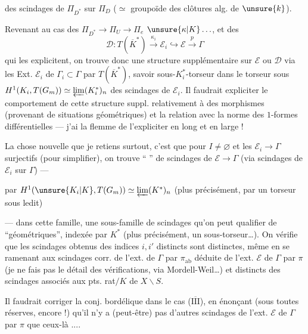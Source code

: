 

des scindages de $\Pi_{D^*}$  sur $\Pi_D$ ($\simeq$ groupoïde des clôtures alg. de $\unsure{k}$).

Revenant au cas des  $\Pi_{D^*}\to\Pi_U\to\Pi_e$ $\unsure{\kappa|K}\ldots$, et des 
\[
\mathcal{D}:T(\overline{K}^*)\xrightarrow{\kappa_i}\mathcal{E}_i\hookrightarrow\mathcal{E}\xrightarrow{p}\Gamma
\]
qui les explicitent, on trouve donc une structure supplémentaire sur $\mathcal{E}$ ou $\mathcal{D}$ via  les Ext. $\mathcal{E}_i$ de $\Gamma_i\subset\Gamma$ par $T(\overline{K}^*)$, savoir   sous-$K_i^*$-torseur dans le torseur sous
$H^1(K_i,T(G_m))\simeq\varprojlim(K_i^*)_n$ des  scindages de $\mathcal{E}_i$.
Il faudrait expliciter le comportement de cette structure suppl. relativement à des morphismes (provenant de situations géométriques) et la relation avec la norme des $1$-formes différentielles --- j'ai la flemme de l'expliciter en long et en large !

La chose nouvelle que je retiens surtout, c'est que pour $I\ne\varnothing$ et les $\mathcal{E}_i\to\Gamma$ surjectifs (pour simplifier), on trouve   `` '' de scindages de $\mathcal{E}\to\Gamma$ (via scindages de $\mathcal{E}_i$ sur $\Gamma$) ---  



par $H^1(\unsure{K_i|K},T(G_m))\simeq\varprojlim(K^*)_n$ (plus précisément, par un torseur sous ledit)

--- dans cette famille, une sous-famille de scindages qu'on peut qualifier de ``géométriques'', indexée par $K^*$ (plus précisément, un sous-torseur\ldots).
On vérifie que les scindages obtenus  des indices $i,i'$ distincts sont distinctes, même en se ramenant aux \unsure{$\pi$-}scindages corr. de l'ext. de $\Gamma$ par $\pi_{\mathrm{ab}}$ déduite de l'ext. $\mathcal{E}$ de $\Gamma$ par $\pi$ (je ne fais pas le détail des vérifications, via Mordell-Weil\ldots) et distincts des scindages associés aux pts. rat$/K$ de $X\backslash S$.

Il faudrait corriger la conj. bordélique dans le cas (\uline{$\overline{\mathrm{III}}$}), en énonçant (sous toutes réserves, encore !) qu'il n'y a (peut-être) pas d'autres scindages de l'ext. $\mathcal{E}$ de $\Gamma$ par $\pi$ que ceux-là ....

